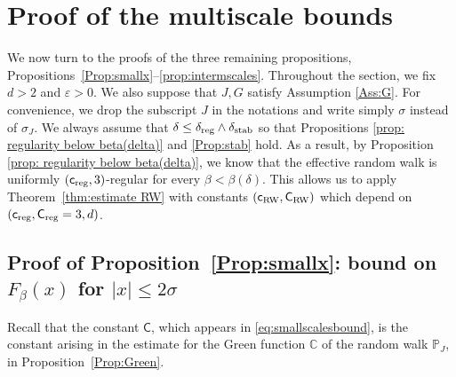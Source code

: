 \documentclass[11pt,a4paper]{article}
\numberwithin{equation}{section}
\theoremstyle{plain}
\theoremstyle{definition}
\newcommand\1{\mathds{1}}
\newcommand\Crw{\mathsf{C}_{\textup{RW}}}
\newcommand\crw{\mathsf{c}_{\textup{RW}}}
\newcommand\CGreen{\mathsf{C}}
\newcommand\creg{\mathsf{c}_{\textup{reg}}}
\newcommand\Creg{\mathsf{C}_{\textup{reg}}}
\newcommand{\deltastab}{\delta_{\textup{stab}}}
\newcommand{\deltareg}{\delta_{\textup{reg}}}
\begin{document}
\section{Proof of the multiscale bounds}\label{sec:4props}



We now turn to the proofs of the three remaining propositions,
Propositions~\ref{Prop:smallx}--\ref{prop:intermscales}. Throughout the section, we fix $d>2$ and $\varepsilon>0$. We also suppose that $J,G$ satisfy Assumption \ref{Ass:G}. For convenience, we drop the subscript $J$ in the notations and write
simply $\sigma$ instead of $\sigma_J$. We always assume that $\delta\leq \deltareg\wedge \deltastab$ so that Propositions \ref{prop: regularity below beta(delta)} and \ref{Prop:stab} hold. As a result, by Proposition \ref{prop: regularity below beta(delta)}, we know that the effective random walk is uniformly $(\creg,3)$-regular for every $\beta<\beta(\delta)$. This allows us to
apply
Theorem~\ref{thm:estimate RW} with constants $(\crw,\Crw)$ which depend on $(\creg,\Creg=3,d)$.


\subsection{Proof of Proposition~\ref{Prop:smallx}: bound on $F_\beta(x)$ for $|x|\leq 2\sigma$}
\label{sec:smallscales}



Recall that the constant $\CGreen$, which appears in \eqref{eq:smallscalesbound},
is the constant arising in the estimate for the Green function $\mathbb C$ of the random walk $\mathbb P_J$,
in Proposition~\ref{Prop:Green}.
\end{document}
